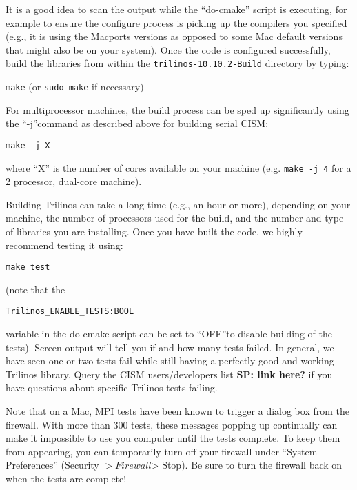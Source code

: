 It is a good idea to scan the output while the ``do-cmake'' script is executing, 
for example to ensure the configure process is picking up the compilers you specified 
(e.g., it is using the Macports versions as opposed to some Mac default versions that 
might also be on your system). Once the code is configured successfully, build the libraries 
from within the \texttt{trilinos-10.10.2-Build} directory by typing:

\texttt{make} (or \texttt{sudo make} if necessary) 

For multiprocessor machines, the build process can be sped up significantly using 
the ``-j''command as described above for building serial CISM:

\texttt{make -j X}

where ``X'' is the number of cores available on your machine (e.g. \texttt{make -j 4} 
for a 2 processor, dual-core machine).

Building Trilinos can take a long time (e.g., an hour or more), depending on your machine, 
the number of processors used for the build, and the number and type of libraries 
you are installing. Once you have built the code, we highly recommend testing it 
using:

 \texttt{make test} 

(note that the

\begin{verbatim}
Trilinos_ENABLE_TESTS:BOOL
\end{verbatim}

variable in the do-cmake script can be set to ``OFF''to disable building of the tests). 
Screen output will tell you if and how many tests failed. In general, we have seen 
one or two tests fail while still having a perfectly good and working Trilinos library. 
Query the CISM users/developers list \textbf{SP: link here?} if you have questions 
about specific Trilinos tests failing. 

\begin{mdframed}[style=mac] %
Note that on a Mac, MPI tests have been known to trigger a dialog box from the firewall. 
With more than 300 tests, these messages popping up continually can make it impossible 
to use you computer until the tests complete. To keep them from appearing, you can temporarily 
turn off your firewall under ``System Preferences'' (Security $> Firewall $> Stop). 
Be sure to turn the firewall back on when the tests are complete!
\end{mdframed}              %

